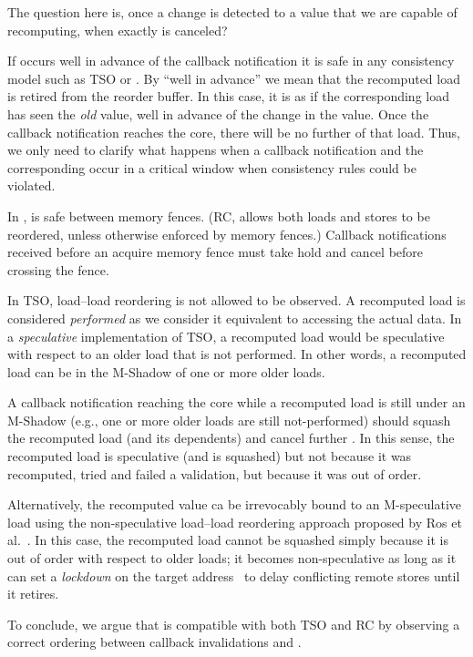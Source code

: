 The question here is, once a change is detected to a value that we are capable of recomputing, when exactly is {\recomp} canceled? 

If {\recomp} occurs well in advance of the callback notification it is safe in any consistency model such as TSO or {\rc}. By ``well in advance'' we mean that the recomputed load is retired from the reorder buffer. In this case, it is as if the corresponding load has seen the \emph{old} value, well in advance of the change in the value. Once the callback notification reaches the core, there will be no further {\recomp} of that load.
Thus, we only need to clarify what happens when a callback notification and the corresponding {\recomp} occur in a critical window when consistency rules could be violated.

In {\rc}, {\recomp} is safe between memory fences. (RC, allows both loads and stores to be reordered, unless otherwise enforced by memory fences.) Callback notifications received before an acquire memory fence must take hold and cancel {\recomp} before crossing the fence.

In TSO, load--load reordering is not allowed to be observed. A recomputed load is considered \emph{performed} as we consider it equivalent to accessing the actual data. In a \emph{speculative} implementation of TSO,  a recomputed load would be speculative with respect to an older load that is not performed. In other words, a recomputed load can be  in the M-Shadow of one or more older loads.

A callback notification reaching the core while a recomputed load is still under an M-Shadow (e.g., one or more older loads are still not-performed) should squash the recomputed load (and its dependents) and cancel further {\recomp}. In this sense, the recomputed load is speculative (and is squashed) but not because it was recomputed, tried and failed a validation, but because it was out of order. 

Alternatively, the recomputed value ca be irrevocably bound to an M-speculative load using the non-speculative load--load reordering approach proposed by Ros et al.~\cite{aros-isca17}. In this case, the recomputed load cannot be squashed simply because it is out of order with respect to older loads; it becomes non-speculative as long as it can set a \emph{lockdown} on the target address~\cite{aros-isca17} to delay conflicting remote stores until it retires.

To conclude, we argue that {\recomp} is compatible with both TSO and RC by observing a correct ordering between callback invalidations and {\recomp}.




